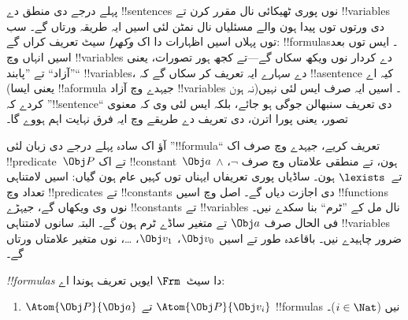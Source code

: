 \documentclass[../../../include/open-logic-section]{subfiles}
\begin{document}

\section{}

پہلے درجے دی منطق دے !!{sentence}s نوں پوری ٹھیکائی نال
مقرر کرن تے !!{variable}s دی ورتوں توں پیدا ہون والے
مسئلیاں نال نمٹن لئی اسیں ایہ طریقہ ورتاں گے۔
سب توں پہلاں اسیں اظہارات دا اک \emph{وکھرا} سیٹ
تعریف کراں گے: !!{formula}s۔ ایس توں بعد
اسیں انہاں وچ !!{variable}s دے کردار نوں ویکھ
سکاں گے---تے کجھ ہور تصورات، یعنی ”آزاد“ تے
”پابند“ !!{variable}s، دے سہارے ایہ تعریف
کر سکاں گے کہ !!a{sentence} کیہ اے (یعنی ایسا
!!a{formula} جیہدے وچ آزاد !!{variable}s نہ
ہون)۔ اسیں ایہ صرف ایس لئی نہیں کردے کہ
”!!{sentence}“ دی تعریف سنبھالن جوگی ہو جائے،
بلکہ ایس لئی وی کہ معنوی تصور، یعنی پورا اترن،
دی تعریف دے طریقے وچ ایہ فرق نہایت اہم ہووے گا۔

آؤ اک سادہ پہلے درجے دی زبان لئی ”!!{formula}“
تعریف کریے، جیہدے وچ صرف اک !!{predicate}~$\Obj P$
تے اک !!{constant}~$\Obj a$ ہون، تے منطقی
علامتاں وچ صرف $\lnot$، $\land$ تے~$\lexists$
ہون۔ ساڈیاں پوری تعریفاں ایہناں توں کہیں عام
ہون گیاں: اسیں لامتناہی تعداد وچ !!{predicate}s
تے !!{constant}s دی اجازت دیاں گے۔ اصل وچ
اسیں !!{function}s نوں وی ویکھاں گے، جیہڑے
!!{constant}s تے !!{variable}s نال مل کے
”ٹرم“ بنا سکدے نیں۔ فی الحال صرف $\Obj a$
تے متغیر ساڈے ٹرم ہون گے۔ البتہ سانوں
لامتناہی !!{variable}s ضرور چاہیدے نیں۔
باقاعدہ طور تے اسیں $\Obj v_0$، $\Obj
v_1$، \dots، نوں متغیر علامتاں ورتاں گے۔

\begin{defn}
\emph{!!{formula}s} دا سیٹ~$\Frm$ ایویں تعریف ہوندا اے:
\begin{enumerate}
\item{} $\Atom{\Obj P}{\Obj a}$ تے $\Atom{\Obj
  P}{\Obj v_i}$ !!{formula}s نیں ($i \in \Nat$)۔




\end{enumerate}
\end{defn}
\end{document}
